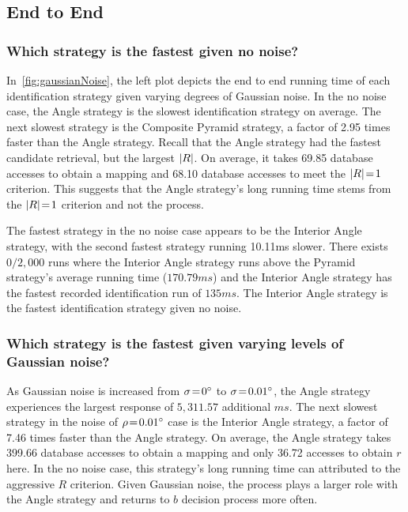 \subsection{End to End}\label{subsec:endToEndEvaluation}
\subsubsection{Which strategy is the fastest given no noise?}
In~\autoref{fig:gaussianNoise}, the left plot depicts the end to end running time of each identification strategy given varying degrees of Gaussian noise.
In the no noise case, the Angle strategy is the slowest identification strategy on average.
The next slowest strategy is the Composite Pyramid strategy, a factor of 2.95 times faster than the Angle strategy.
Recall that the Angle strategy had the fastest candidate retrieval, but the largest $\left| R \right|$.
On average, it takes 69.85 database accesses to obtain a mapping and 68.10 database accesses to meet the $\left| R \right| \!=\! 1$ criterion.
This suggests that the Angle strategy's long running time stems from the $\left| R \right| \!=\! 1$ criterion and not the  process.

The fastest strategy in the no noise case appears to be the Interior Angle strategy, with the second fastest strategy running 10.11\si{ms} slower.
There exists $0 / 2{,}000$ runs where the Interior Angle strategy runs above the Pyramid strategy's average running time ($170.79\si{ms}$) and the Interior Angle strategy has the fastest recorded identification run of $135\si{ms}$.
The Interior Angle strategy is the fastest identification strategy given no noise.

\subsubsection{Which strategy is the fastest given varying levels of Gaussian noise?}
As Gaussian noise is increased from $\sigma\!=\!\ang{0}$ to $\sigma\!=\!\ang{0.01}$, the Angle strategy experiences the largest response of $5{,}311.57$ additional $\si{ms}$.
The next slowest strategy in the noise of $\rho\!=\!\ang{0.01}$ case is the Interior Angle strategy, a factor of 7.46 times faster than the Angle strategy.
On average, the Angle strategy takes 399.66 database accesses to obtain a mapping and only 36.72 accesses to obtain $r$ here.
In the no noise case, this strategy's long running time can attributed to the aggressive $R$ criterion.
Given Gaussian noise, the  process plays a larger role with the Angle strategy and returns to $b$ decision process more often.

